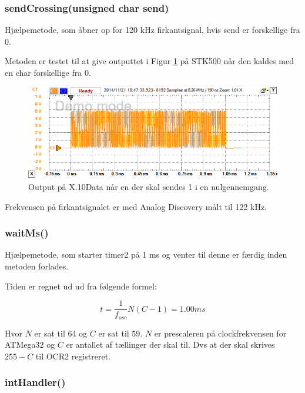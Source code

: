 \subsubsection{sendCrossing(unsigned char send)}

Hjælpemetode, som åbner op for 120 kHz firkantsignal, hvis send er forskellige fra 0.

Metoden er testet til at give outputtet i Figur \ref{fig:sendCrossingtest} på STK500 når den kaldes med en char forskellige fra 0. 

\begin{figure}[h]
\centering
\includegraphics[width=\textwidth]{../Implementering/SW_implementering/Transmitter/sendCrossing_test}
\caption{Output på X.10Data når en der skal sendes 1 i en nulgennemgang.}
\label{fig:sendCrossingtest}
\end{figure}

Frekvensen på firkantsignalet er med Analog Discovery målt til 122 kHz.

\subsubsection{waitMs()}

Hjælpemetode, som starter timer2 på 1 ms og venter til denne er færdig inden metoden forlades. 

Tiden er regnet ud ud fra følgende formel:

\begin{displaymath}
t = \frac{1}{f_{osc}} N (C - 1) = 1.00 ms
\end{displaymath}

Hvor $N$ er sat til 64 og $C$ er sat til 59. $N$ er prescaleren på clockfrekvensen for ATMega32 og $C$ er antallet af tællinger der skal til. Dvs at der skal skrives $255 - C$ til OCR2 registreret.

\subsubsection{intHandler()}

